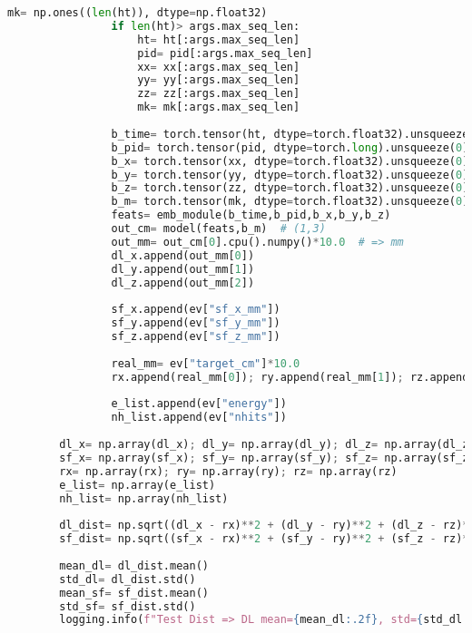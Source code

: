 \begin{lstlisting}[language=Python, caption={模型训练、验证与测试对比脚本 (train\_val\_test\_compare\_v1.py)}, label={lst:train_script}]
                mk= np.ones((len(ht)), dtype=np.float32)
                if len(ht)> args.max_seq_len:
                    ht= ht[:args.max_seq_len]
                    pid= pid[:args.max_seq_len]
                    xx= xx[:args.max_seq_len]
                    yy= yy[:args.max_seq_len]
                    zz= zz[:args.max_seq_len]
                    mk= mk[:args.max_seq_len]
    
                b_time= torch.tensor(ht, dtype=torch.float32).unsqueeze(0).to(device)
                b_pid= torch.tensor(pid, dtype=torch.long).unsqueeze(0).to(device)
                b_x= torch.tensor(xx, dtype=torch.float32).unsqueeze(0).to(device)
                b_y= torch.tensor(yy, dtype=torch.float32).unsqueeze(0).to(device)
                b_z= torch.tensor(zz, dtype=torch.float32).unsqueeze(0).to(device)
                b_m= torch.tensor(mk, dtype=torch.float32).unsqueeze(0).to(device)
                feats= emb_module(b_time,b_pid,b_x,b_y,b_z)
                out_cm= model(feats,b_m)  # (1,3)
                out_mm= out_cm[0].cpu().numpy()*10.0  # => mm
                dl_x.append(out_mm[0])
                dl_y.append(out_mm[1])
                dl_z.append(out_mm[2])
    
                sf_x.append(ev["sf_x_mm"])
                sf_y.append(ev["sf_y_mm"])
                sf_z.append(ev["sf_z_mm"])
    
                real_mm= ev["target_cm"]*10.0
                rx.append(real_mm[0]); ry.append(real_mm[1]); rz.append(real_mm[2])
    
                e_list.append(ev["energy"])
                nh_list.append(ev["nhits"])
    
        dl_x= np.array(dl_x); dl_y= np.array(dl_y); dl_z= np.array(dl_z)
        sf_x= np.array(sf_x); sf_y= np.array(sf_y); sf_z= np.array(sf_z)
        rx= np.array(rx); ry= np.array(ry); rz= np.array(rz)
        e_list= np.array(e_list)
        nh_list= np.array(nh_list)
    
        dl_dist= np.sqrt((dl_x - rx)**2 + (dl_y - ry)**2 + (dl_z - rz)**2)
        sf_dist= np.sqrt((sf_x - rx)**2 + (sf_y - ry)**2 + (sf_z - rz)**2)
    
        mean_dl= dl_dist.mean()
        std_dl= dl_dist.std()
        mean_sf= sf_dist.mean()
        std_sf= sf_dist.std()
        logging.info(f"Test Dist => DL mean={mean_dl:.2f}, std={std_dl:.2f}, SF mean={mean_sf:.2f}, std={std_sf:.2f}")
    

\end{lstlisting}
